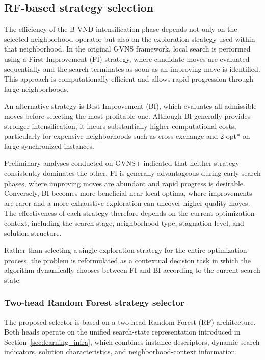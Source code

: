 \subsection{RF-based strategy selection} 
\label{sec:rf_selector}

The efficiency of the B-VND intensification phase depends not only on the selected neighborhood operator but also on the exploration strategy used within that neighborhood. In the original GVNS framework, local search is performed using a First Improvement (FI) strategy, where candidate moves are evaluated sequentially and the search terminates as soon as an improving move is identified. This approach is computationally efficient and allows rapid progression through large neighborhoods.

An alternative strategy is Best Improvement (BI), which evaluates all admissible moves before selecting the most profitable one. Although BI generally provides stronger intensification, it incurs substantially higher computational costs, particularly for expensive neighborhoods such as cross-exchange and 2-opt* on large synchronized instances.

Preliminary analyses conducted on GVNS+ indicated that neither strategy consistently dominates the other. FI is generally advantageous during early search phases, where improving moves are abundant and rapid progress is desirable. Conversely, BI becomes more beneficial near local optima, where improvements are rarer and a more exhaustive exploration can uncover higher-quality moves. The effectiveness of each strategy therefore depends on the current optimization context, including the search stage, neighborhood type, stagnation level, and solution structure.

Rather than selecting a single exploration strategy for the entire optimization process, the problem is reformulated as a contextual decision task in which the algorithm dynamically chooses between FI and BI according to the current search state.

\subsubsection{Two-head Random Forest strategy selector}
The proposed selector is based on a two-head Random Forest (RF) architecture. Both heads operate on the unified search-state representation introduced in Section~\ref{sec:learning_infra}, which combines instance descriptors, dynamic search indicators, solution characteristics, and neighborhood-context information.

